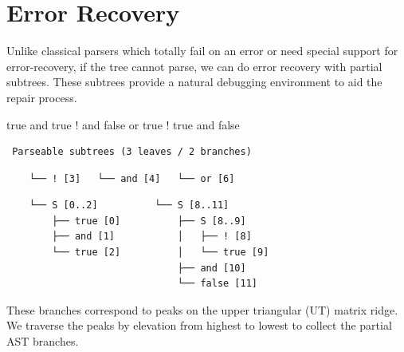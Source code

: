 \documentclass[sigplan,nonacm]{acmart}\settopmatter{printfolios=false,printccs=false,printacmref=false}
\begin{document}
\pagebreak\section{Error Recovery}\label{sec:error}

Unlike classical parsers which totally fail on an error or need special support for error-recovery, if the tree cannot parse, we can do error recovery with partial subtrees. These subtrees provide a natural debugging environment to aid the repair process.

\begin{tidyinput}
true and true ! and false or true ! true and false
\end{tidyinput}

\begin{verbatim}
 Parseable subtrees (3 leaves / 2 branches)
\end{verbatim}
\hspace{0.64cm}\hspace{1.70cm}\hspace{1.98cm}\vspace{-14pt}
\begin{verbatim}
    └── ! [3]   └── and [4]   └── or [6]
\end{verbatim}
\hspace{0.63cm}\hspace{3.4cm}\vspace{-14pt}
\begin{verbatim}
    └── S [0..2]          └── S [8..11]
        ├── true [0]          ├── S [8..9]
        ├── and [1]           │   ├── ! [8]
        └── true [2]          │   └── true [9]
                              ├── and [10]
                              └── false [11]
\end{verbatim}

\noindent These branches correspond to peaks on the upper triangular (UT) matrix ridge. We traverse the peaks by elevation from highest to lowest to collect the partial AST branches.
\end{document}
